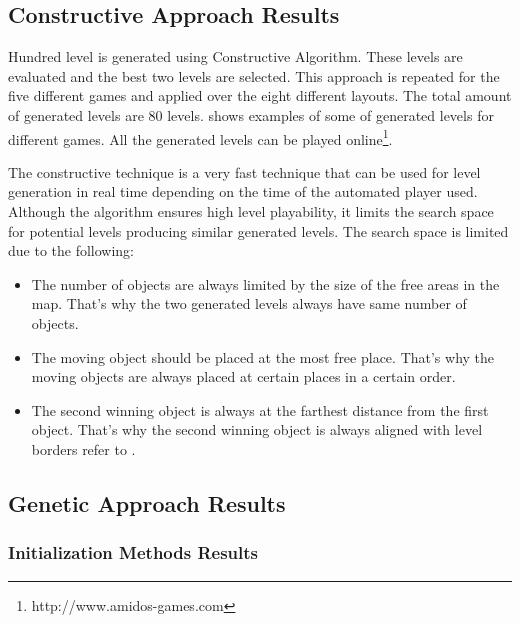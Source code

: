 
\subsection{Constructive Approach Results}
Hundred level is generated using Constructive Algorithm. These levels are evaluated and the best two levels are selected. This approach is repeated for the five different games and applied over the eight different layouts. The total amount of generated levels are 80 levels.  shows examples of some of generated levels for different games. All the generated levels can be played online\footnote{http://www.amidos-games.com}.\\\par


The constructive technique is a very fast technique that can be used for level generation in real time depending on the time of the automated player used. Although the algorithm ensures high level playability, it limits the search space for potential levels producing similar generated levels. The search space is limited due to the following:
\begin{itemize} \itemsep0pt \parskip0pt 
	\item The number of objects are always limited by the size of the free areas in the map. That's why the two generated levels always have same number of objects.
	\item The moving object should be placed at the most free place. That's why the moving objects are always placed at certain places in a certain order.
	\item The second winning object is always at the farthest distance from the first object. That's why the second winning object is always aligned with level borders refer to .
\end{itemize}

\subsection{Genetic Approach Results}

\subsubsection{Initialization Methods Results}

